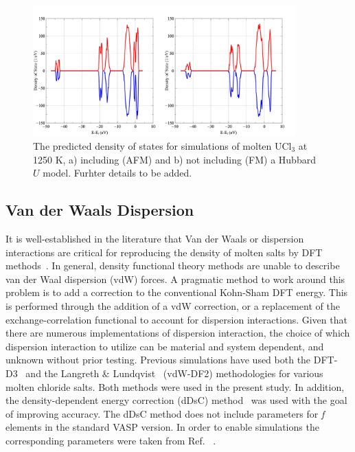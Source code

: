 \documentclass[preprint,3p,10pt,onecolumn,number,sort&compress]{elsarticle}
\begin{document}
\begin{figure}[h]
\centering
\includegraphics[width=0.9\textwidth]{fig2.jpg}
\caption{The predicted density of states for simulations of molten UCl$_3$ at 1250 K, a) including (AFM) and b) not including (FM) a Hubbard $U$ model. {\color{red} Furhter details to be added.}} 
\label{fig:DOS}
\end{figure}


\subsection{Van der Waals Dispersion}

It is well-established in the literature that Van der Waals or dispersion interactions are critical for reproducing the density of molten salts by DFT methods~\cite{Li,Nam2014,Nam2015}. In general, density functional theory methods are unable to describe van der Waal dispersion (vdW) forces. A pragmatic method to work around this problem is to add a correction to the conventional Kohn-Sham DFT energy. This is performed through the addition of a vdW correction, or a replacement of the exchange-correlation functional to account for dispersion interactions. Given that there are numerous implementations of dispersion interaction, the choice of which dispersion interaction to utilize can be material and system dependent, and unknown without prior testing. Previous simulations have used both the DFT-D3~\cite{Li,Grimme} and the Langreth \& Lundqvist~\cite{Nam2015,Dion,Klimes} (vdW-DF2) methodologies for various molten chloride salts. Both methods were used in the present study. In addition, the density-dependent energy correction (dDsC) method~\cite{Steinmann2011,Steinmann2} was used with the goal of improving accuracy. The dDsC method does not include parameters for \textit{f} elements in the standard VASP version. In order to enable simulations the corresponding parameters were taken from Ref. ~\cite{Kim}. 
\end{document}
